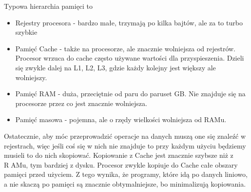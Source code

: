 Typowa hierarchia pamięci to 
\begin{itemize}
  \item Rejestry procesora - bardzo małe, trzymają po kilka bajtów, ale za to turbo szybkie
  \item Pamięć Cache - także na procesorze, ale znacznie wolniejsza od rejestrów. Procesor wrzuca do cache często używane wartości dla przyspieszenia. Dzieli się zwykle dalej na L1, L2, L3, gdzie każdy kolejny jest większy ale wolniejszy.
  \item Pamięć RAM - duża, przeciętnie od paru do paruset GB. Nie znajduje się na procesorze przez co jest znacznie wolniejsza.
  \item Pamięć masowa - pojemna, ale o rzędy wielkości wolniejsza od RAMu. 
\end{itemize}
Ostatecznie, aby móc przeprowadzić operacje na danych muszą one się znaleźć w rejestrach, więc jeśli coś się w nich nie znajduje to przy każdym użyciu będziemy musieli to do nich skopiować. Kopiowanie z Cache jest znacznie szybsze niż z RAMu, tym bardziej z dysku. Procesor zwykle kopiuje do Cache całe obszary pamięci przed użyciem. Z tego wynika, że programy, które idą po danych liniowo, a nie skaczą po pamięci są znacznie obtymalniejsze, bo minimalizują kopiowania.  
